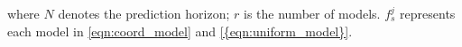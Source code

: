 \documentclass[journal]{IEEEtran}
\newcommand{\todoQ}[1]{\vspace{0px} %
	\todo[inline, color=orange!50]{\textbf{[Note:]} {#1}} %
}
\newcommand{\todohere}[1]{\hl{(\textbf{TODO:} #1)}}
\begin{document}
where $N$ denotes the prediction horizon; $r$ is the number of models. $f_s^j$ represents  each model in \cref{eqn:coord_model} and \cref{{eqn:uniform_model}}.
	
\end{document}
